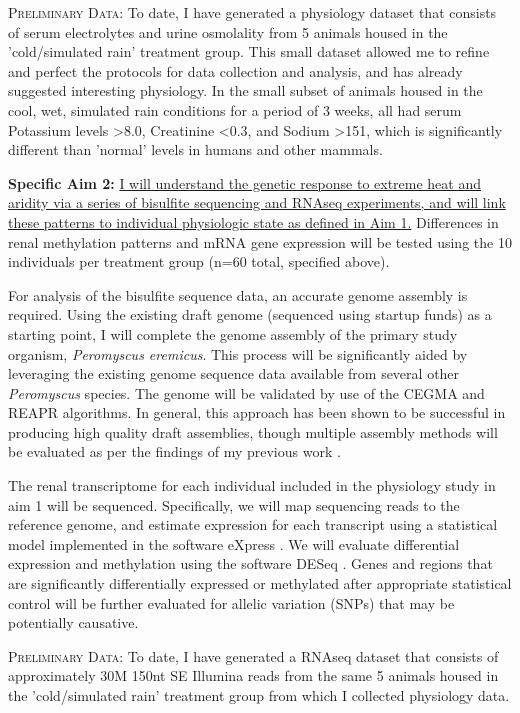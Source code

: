 \documentclass[12pt]{article}
\begin{document}
\textsc{{Preliminary Data:}} To date, I have generated a physiology dataset that consists of serum electrolytes and urine osmolality from 5 animals housed in the 'cold/simulated rain' treatment group. This small dataset allowed me to refine and perfect the protocols for data collection and analysis, and has already suggested interesting physiology. In the small subset of animals housed in the cool, wet, simulated rain conditions for a period of 3 weeks, all had serum Potassium levels \textgreater 8.0, Creatinine \textless 0.3, and Sodium \textgreater 151, which is significantly different than 'normal' levels in humans and other mammals.  

\textbf{Specific Aim 2:} \ul{I will understand the genetic response to extreme heat and aridity via a series of bisulfite sequencing and RNAseq experiments, and will link these patterns to individual physiologic state as defined in Aim 1.} Differences in renal methylation patterns and mRNA gene expression will be tested using the 10 individuals per treatment group (n=60 total, specified above). 

For analysis of the bisulfite sequence data, an accurate genome assembly is required. Using the existing draft genome (sequenced using startup funds) as a starting point, I will complete the genome assembly of the primary study organism, \textit{Peromyscus eremicus}. This process will be significantly aided by leveraging the existing genome sequence data available from several other \textit{Peromyscus} species. The genome will be validated by use of the CEGMA \citep{Parra:2007df} and REAPR \citep{Hunt:2013hj} algorithms. In general, this approach has been shown to be successful in producing high quality draft assemblies, though multiple assembly methods will be evaluated as per the findings of my previous work \citep{Bradnam:2013gx}.

The renal transcriptome for each individual included in the physiology study in aim 1 will be sequenced. Specifically, we will map sequencing reads to the reference genome, and estimate expression for each transcript using a statistical model implemented in the software eXpress \cite{Roberts:2012dh}. We will evaluate differential expression and methylation using the software DESeq \cite{Anders:2012es}. Genes and regions that are significantly differentially expressed or methylated after appropriate statistical control will be further evaluated for allelic variation (SNPs) that may be potentially causative.  

\textsc{{Preliminary Data:}} To date, I have generated a RNAseq dataset that consists of approximately 30M 150nt SE Illumina reads from the same 5 animals housed in the 'cold/simulated rain' treatment group from which I collected physiology data. 
\end{document}
